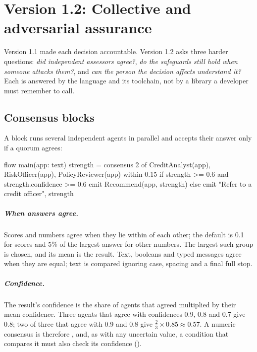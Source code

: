 \chapter{Version 1.2: Collective and adversarial assurance}
\label{ch:v12}

Version 1.1 made each decision accountable. Version 1.2 asks three harder questions: \emph{did independent assessors agree?}, \emph{do the safeguards still hold when someone attacks them?}, and \emph{can the person the decision affects understand it?} Each is answered by the language and its toolchain, not by a library a developer must remember to call.

\section{Consensus blocks}

A  block runs several independent agents in parallel and accepts their answer only if a quorum agrees:

\begin{algo}[title=examples/v12/credit\_consensus.algo (excerpt)]
flow main(app: text) {
    strength = consensus 2 of { CreditAnalyst(app), RiskOfficer(app), PolicyReviewer(app) } within 0.15
    if strength >= 0.6 and strength.confidence >= 0.6 {
        emit Recommend(app, strength)
    } else {
        emit "Refer to a credit officer", strength
    }
}
\end{algo}

\paragraph{When answers agree.} Scores and numbers agree when they lie within  of each other; the default is 0.1 for scores and 5\% of the largest answer for other numbers. The largest such group is chosen, and its mean is the result. Text, booleans and typed messages agree when they are equal; text is compared ignoring case, spacing and a final full stop.

\paragraph{Confidence.} The result's confidence is the share of agents that agreed multiplied by their mean confidence. Three agents that agree with confidences 0.9, 0.8 and 0.7 give 0.8; two of three that agree with 0.9 and 0.8 give $\tfrac23 \times 0.85 \approx 0.57$. A numeric consensus is therefore , and, as with any uncertain value, a condition that compares it must also check its confidence ().

